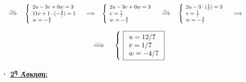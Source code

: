 \documentclass[fleqn]{article}
\begin{document}
\[
\hspace{0.321cm} \overset{r_2:}{\implies} \hspace{0.321cm}
\left\{
\begin{array}{l}
2u - 3v + 0w = 3 \\
11v + 1 \cdot (-\frac{4}{7}) = 1 \\
w = -\frac{4}{7}
\end{array}
\right.
\hspace{0.321cm} {\implies} \hspace{0.321cm}
\left\{
\begin{array}{l}
2u - 3v + 0w = 3 \\
v = \frac{1}{7} \\
w = -\frac{4}{7}
\end{array}
\right.
\hspace{0.321cm} \overset{r_1:}{\implies} \hspace{0.321cm}
\left\{
\begin{array}{l}
2u - 3 \cdot (\frac{1}{7})= 3 \\
v = \frac{1}{7} \\
w = -\frac{4}{7}
\end{array}
\right.
\hspace{0.321cm} \overset{}{\implies} \hspace{0.321cm}
\]

\[
\hspace{0.321cm} \overset{... \hspace{0.150cm}}{\implies} \hspace{0.321cm}
\left\{
\hspace{0.123456789cm} \boxed
{
\begin{array}{l}
u = 12 / 7 \\
v = 1 / 7 \\
w = - 4 / 7
\end{array}
}
\right.
\]




\vspace{2.000cm}
{{\textbf{·  \underline{2\textsuperscript{η} Άσκηση:}}}}
\vspace{0.321cm}
\end{document}
